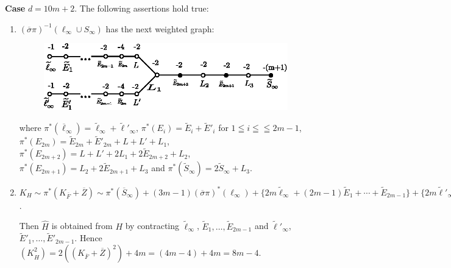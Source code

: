 \subsubsection{}\label{chap3:3.6.2}
{\bf Case} $d=10m+2$. The following assertions hold true:
\begin{enumerate}
\renewcommand{\labelenumi}{(\theenumi)}
\item $(\overline{\sigma}\pi)^{-1}(\ell_{\infty}\cup S_{\infty})$ has
  the next weighted graph:
\begin{figure}[H]
\centering
\includegraphics[scale=1.1]{figures/miyansi_fig45.eps}
\end{figure}
\noindent
where
$\pi^{\ast}(\overline{\ell}_{\infty})=\widetilde{\ell}_{\infty}+\widetilde{\ell}'_{\infty}$,
$\pi^{\ast}(E_{i})=\widetilde{E}_{i}+\widetilde{E}'_{i}$ for $1\leqq
i\leqq\leqq 2m-1$,
$\pi^{\ast}(E_{2m})=\widetilde{E}_{2m}+\widetilde{E}'_{2m}+L+L'+L_{1}$,
$\pi^{\ast}(E_{2m+2})=L+L'+2L_{1}+2\widetilde{E}_{2m+2}+L_{2}$,
$\pi^{\ast}(E_{2m+1})=L_{2}+2\widetilde{E}_{2m+1}+L_{3}$ and
$\pi^{\ast}(\widetilde{S}_{\infty})=2\widetilde{S}_{\infty}+L_{3}$. 

\item
  $K_{H}\sim\pi^{\ast}(K_{\overline{F}}+\overline{Z})\sim\pi^{\ast}(\overline{S}_{\infty})+(3m-1)(\overline{\sigma}\pi)^{\ast}(\ell_{\infty})+\{2m\widetilde{\ell}_{\infty}+(2m-1)\widetilde{E}_{1}+\cdots+\widetilde{E}_{2m-1}\}+\{2m\widetilde{\ell}'_{\infty}+(2m-1)\widetilde{E}'_{1}+\cdots+\widetilde{E}'_{2m-1}\}+2\widetilde{E}_{2m+1}+2\widetilde{E}_{2m+2}+L+L'+L_{1}+2L_{2}+L_{3}$. 

Then $\widehat{H}$ is obtained from $H$ by contracting
$\widetilde{\ell}_{\infty}$, 
$\widetilde{E}_{1},\ldots, \widetilde{E}_{2m-1}$ and
$\widetilde{\ell}'_{\infty}$,
$\widetilde{E}'_{1},\ldots,\widetilde{E}'_{2m-1}$. Hence
$(K^{2}_{\widehat{H}})=2((K_{\overline{F}}+\overline{Z})^{2})+4m=(4m-4)+4m=8m-4$. 
\end{enumerate}

